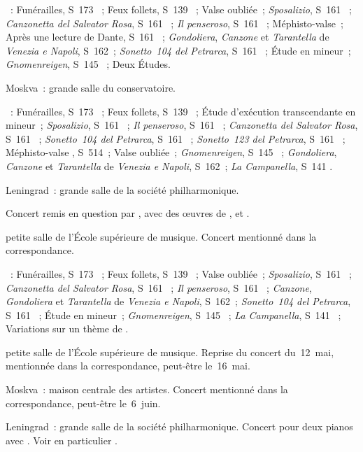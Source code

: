\begin{description}
 \textsc{\Liszt{}}~: Funérailles, S~173 ~; Feux follets, S~139
 ~; Valse oubliée~; \emph{Sposalizio}, S~161 ~;
 \emph{Canzonetta del Salvator Rosa}, S~161 ~; \emph{Il
 penseroso}, S~161 ~; Méphisto-valse~; Après une lecture de Dante,
 S~161 ~; \emph{Gondoliera}, \emph{Canzone} et \emph{Tarantella}
 de \emph{Venezia e Napoli}, S~162~; \emph{Sonetto~104 del Petrarca}, S~161
 ~; Étude en \kF mineur~; \emph{Gnomenreigen}, S~145 ~;
 Deux Études.
 \item[\DateWithWeekDay{1932-04-20}]
 Moskva~: grande salle du conservatoire.

 \textsc{\Liszt{}}~: Funérailles, S~173 ~; Feux follets, S~139
 ~; Étude d'exécution transcendante  en \kF mineur~;
 \emph{Sposalizio}, S~161 ~; \emph{Il penseroso}, S~161
 ~; \emph{Canzonetta del Salvator Rosa}, S~161 ~;
 \emph{Sonetto~104 del Petrarca}, S~161 ~; \emph{Sonetto~123 del
 Petrarca}, S~161 ~; Méphisto-valse , S~514~; Valse
 oubliée~; \emph{Gnomenreigen}, S~145 ~; \emph{Gondoliera},
 \emph{Canzone} et \emph{Tarantella} de \emph{Venezia e Napoli}, S~162~;
 \emph{La Campanella}, S~141 .
 \item[\DateWithWeekDay{1932-04-25}]
 Leningrad~: grande salle de la société philharmonique.

 Concert remis en question par \Vizel{}, avec des œuvres de \Schumann{},
 \Brahms{} et \Chopin{}.
 \item[\DateWithWeekDay{1932-05-12}]
 petite salle de l'\hbox{École} supérieure de musique.
 Concert mentionné dans la correspondance.

 \textsc{\Liszt{}}~: Funérailles, S~173 ~; Feux follets, S~139
 ~; Valse oubliée~; \emph{Sposalizio}, S~161 ~;
 \emph{Canzonetta del Salvator Rosa}, S~161 ~; \emph{Il
 penseroso}, S~161 ~; \emph{Canzone}, \emph{Gondoliera} et
 \emph{Tarantella} de \emph{Venezia e Napoli}, S~162~; \emph{Sonetto~104
 del Petrarca}, S~161 ~; Étude en \kF mineur~;
 \emph{Gnomenreigen}, S~145 ~; \emph{La Campanella}, S~141
 ~; Variations sur un thème de \Paganini{}.
 \item[\DateWithWeekDay{1932-05-14}]
 petite salle de l'\hbox{École} supérieure de musique.
 Reprise du concert du~12~mai, mentionnée dans la correspondance, peut-être
 le~16~mai.
 \item[\DateWithWeekDay{1932-06-05}]
 Moskva~: maison centrale des artistes.
 Concert mentionné dans la correspondance, peut-être le~6~juin.
 \item[\DateWithWeekDay{1932-06-09}]
 Leningrad~: grande salle de la société philharmonique.
 Concert pour deux pianos avec \LOborine{}.
 Voir en particulier \citet[p.~437]{Milshteyn82a}.


\end{description}
